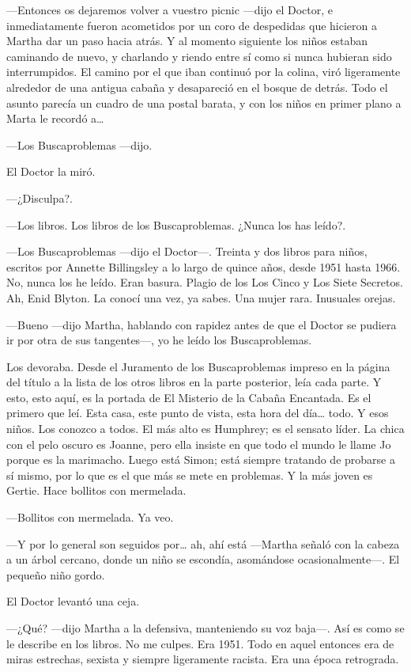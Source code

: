 ---Entonces os dejaremos volver a vuestro picnic ---dijo el Doctor, e inmediatamente fueron acometidos por un coro de despedidas que hicieron a Martha dar un paso hacia atrás. Y al momento siguiente los niños estaban caminando de nuevo, y charlando y riendo entre sí como si nunca hubieran sido interrumpidos. El camino por el que iban continuó por la colina, viró ligeramente alrededor de una antigua cabaña y desapareció en el bosque de detrás. Todo el asunto parecía un cuadro de una postal barata, y con los niños en primer plano a Marta le recordó a\ldots{}

---Los Buscaproblemas ---dijo.

El Doctor la miró.

---¿Disculpa?.

---Los libros. Los libros de los Buscaproblemas. ¿Nunca los has leído?.

---Los Buscaproblemas ---dijo el Doctor---. Treinta y dos libros para niños, escritos por Annette Billingsley a lo largo de quince años, desde 1951 hasta 1966. No, nunca los he leído. Eran basura. Plagio de los Los Cinco y Los Siete Secretos. Ah, Enid Blyton. La conocí una vez, ya sabes. Una mujer rara. Inusuales orejas.

---Bueno ---dijo Martha, hablando con rapidez antes de que el Doctor se pudiera ir por otra de sus tangentes---, yo he leído los Buscaproblemas.

Los devoraba. Desde el Juramento de los Buscaproblemas impreso en la página del título a la lista de los otros libros en la parte posterior, leía cada parte. Y esto, esto aquí, es la portada de El Misterio de la Cabaña Encantada. Es el primero que leí. Esta casa, este punto de vista, esta hora del día\ldots{} todo. Y esos niños. Los conozco a todos. El más alto es Humphrey; es el sensato líder. La chica con el pelo oscuro es Joanne, pero ella insiste en que todo el mundo le llame Jo porque es la marimacho. Luego está Simon; está siempre tratando de probarse a sí mismo, por lo que es el que más se mete en problemas. Y la más joven es Gertie. Hace bollitos con mermelada.

---Bollitos con mermelada. Ya veo.

---Y por lo general son seguidos por\ldots{} ah, ahí está ---Martha señaló con la cabeza a un árbol cercano, donde un niño se escondía, asomándose ocasionalmente---. El pequeño niño gordo.

El Doctor levantó una ceja.

---¿Qué? ---dijo Martha a la defensiva, manteniendo su voz baja---. Así es como se le describe en los libros. No me culpes. Era 1951. Todo en aquel entonces era de miras estrechas, sexista y siempre ligeramente racista. Era una época retrograda.

